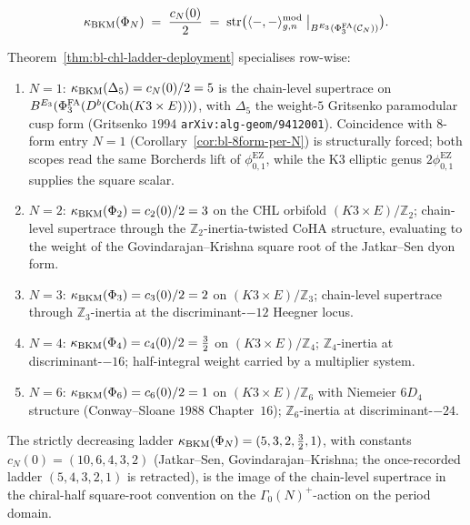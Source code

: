 \begin{equation}
\label{eq:bl7-master-chapter}
 \kappa_{\mathrm{BKM}}(\Phi_N) \;=\; \frac{c_N(0)}{2} \;=\;
 \mathrm{str}\bigl(
 \langle -, - \rangle^{\mathrm{mod}}_{g, n}
 \bigm|_{B^{E_{3}}(\Phi^{\mathrm{FA}}_{3}(\mathcal{C}_N))}
 \bigr).
\end{equation}

\begin{corollary}
\label{cor:bl-chl-per-N}
Theorem~\ref{thm:bl-chl-ladder-deployment} specialises row-wise:
\begin{enumerate}
 \item $N = 1$: $\kappa_{\mathrm{BKM}}(\Delta_5) = c_N(0)/2 = 5$ is the chain-level
 supertrace on $B^{E_{3}}(\Phi^{\mathrm{FA}}_{3}(D^b(\mathrm{Coh}(K3 \times E))))$, with
 $\Delta_5$ the weight-$5$ Gritsenko paramodular cusp form (Gritsenko
 $1994$ \texttt{arXiv:alg-geom/9412001}). Coincidence with 8-form entry
 $N = 1$ (Corollary~\ref{cor:bl-8form-per-N}) is structurally forced;
 both scopes read the same Borcherds lift of
 \(\phi_{0,1}^{\mathrm{EZ}}\), while the K3 elliptic genus
 \(2\phi_{0,1}^{\mathrm{EZ}}\) supplies the square scalar.
 \item $N = 2$: $\kappa_{\mathrm{BKM}}(\Phi_2) = c_2(0)/2 = 3$ on the CHL orbifold
 $(K3 \times E) / \mathbb{Z}_2$; chain-level supertrace through the
 $\mathbb{Z}_2$-inertia-twisted CoHA structure, evaluating to the
 weight of the Govindarajan--Krishna square root of the Jatkar--Sen
 dyon form.
 \item $N = 3$: $\kappa_{\mathrm{BKM}}(\Phi_3) = c_3(0)/2 = 2$ on $(K3 \times E) / \mathbb{Z}_3$;
 chain-level supertrace through $\mathbb{Z}_3$-inertia at the
 discriminant-$-12$ Heegner locus.
 \item $N = 4$: $\kappa_{\mathrm{BKM}}(\Phi_4) = c_4(0)/2 = \tfrac32$ on $(K3 \times E) / \mathbb{Z}_4$;
 $\mathbb{Z}_4$-inertia at discriminant-$-16$; half-integral weight
 carried by a multiplier system.
 \item $N = 6$: $\kappa_{\mathrm{BKM}}(\Phi_6) = c_6(0)/2 = 1$ on $(K3 \times E) / \mathbb{Z}_6$
 with Niemeier $6D_4$ structure (Conway--Sloane $1988$ Chapter~$16$);
 $\mathbb{Z}_6$-inertia at discriminant-$-24$.
\end{enumerate}
The strictly decreasing ladder $\kappa_{\mathrm{BKM}}(\Phi_N) = (5, 3, 2, \tfrac32, 1)$,
with constants $c_N(0) = (10, 6, 4, 3, 2)$ (Jatkar--Sen,
Govindarajan--Krishna; the once-recorded ladder $(5, 4, 3, 2, 1)$ is
retracted), is the image of the chain-level supertrace in the
chiral-half square-root convention on the $\Gamma_0(N)^+$-action on
the period domain.
\end{corollary}

